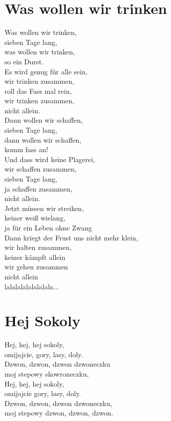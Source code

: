 \documentclass[twoside,8pt]{scrartcl}
\begin{document}
\section{Was wollen wir trinken}
Was wollen wir trinken,\\
sieben Tage lang,\\
was wollen wir trinken,\\
so ein Durst.\\
\newline
Es wird genug für alle sein,\\
wir trinken zusammen,\\
roll das Fass mal rein,\\
wir trinken zusammen,\\
nicht allein.\\
\newline
Dann wollen wir schaffen,\\
sieben Tage lang,\\
dann wollen wir schaffen,\\
komm fass an!\\
\newline
Und dass wird keine Plagerei,\\
wir schaffen zusammen,\\
sieben Tage lang,\\
ja schaffen zusammen,\\
nicht allein.\\
\newline
Jetzt müssen wir streiken,\\
keiner weiß wielang,\\
ja für ein Leben ohne Zwang\\
\newline
Dann kriegt der Frust uns nicht mehr klein,\\
wir halten zusammen,\\
keiner kämpft allein\\
wir gehen zusammen\\
nicht allein\\
\newline
lalalalalalalalala...
\clearpage
\section{Hej Sokoly}
Hej, hej, hej sokoly,\\
omijajcie, gory, lasy, doly.\\
Dzwon, dzwon, dzwon dzwoneczku\\
moj stepowy skowroneczku,\\
Hej, hej, hej sokoly,\\
omijajcie gory, lasy, doly.\\
Dzwon, dzwon, dzwon dzwoneczku,\\
moj stepowy dzwon, dzwon, dzwon.\\
\end{document}
